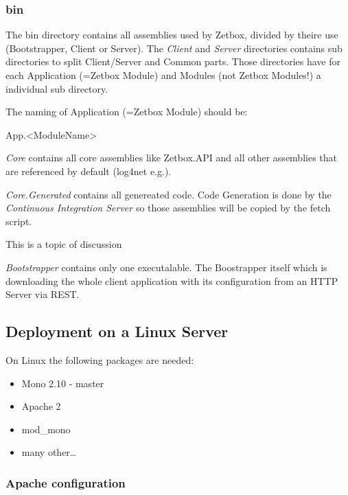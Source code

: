 \subsubsection{bin}
The bin directory contains all assemblies used by Zetbox, divided by theire use
(Bootstrapper, Client or Server). The \emph{Client} and \emph{Server}
directories contains sub directories to split Client/Server and Common parts.
Those directories have for each Application (=Zetbox Module) and Modules (not Zetbox
Modules!) a individual sub directory.

The naming of Application (=Zetbox Module) should be:

\begin{center}
App.\textless ModuleName\textgreater  
\end{center}

\emph{Core} contains all core assemblies like Zetbox.API and all other
assemblies that are referenced by default (log4net e.g.).

\emph{Core.Generated} contains all genereated code. Code Generation is done by
the \emph{Continuous Integration Server} so those assemblies will be copied by
the fetch script.

\begin{note}
This is a topic of discussion
\end{note}

\emph{Bootstrapper} contains only one executalable. The Boostrapper itself which
is downloading the whole client application with its configuration from an HTTP
Server via REST.

\subsection{Deployment on a Linux Server}

On Linux the following packages are needed:

\begin{itemize}
  \item Mono 2.10 - master
  \item Apache 2
  \item mod\_mono
  \item many other\ldots
 \end{itemize}

\subsubsection{Apache configuration}

